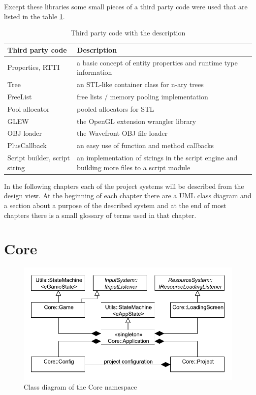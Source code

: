 \documentclass[a4paper, 12pt]{report}
\begin{document}
Except these libraries some small pieces of a third party code were used that are listed in the table \ref{tab:code-list}.

\begin{table}[htbp]
	\centering
		\begin{tabular}{|p{0.28\hsize}|p{0.65\hsize}|}
			\hline
			Third party code & Description\\
			\hline
			Properties, RTTI\cite{gpg5} & a basic concept of entity properties and runtime type information\\
			Tree\cite{tree} & an STL-like container class for n-ary trees\\
			FreeList\cite{gpg5} & free lists / memory pooling implementation\\
			Pool allocator\cite{allocator} & pooled allocators for STL\\
			GLEW\cite{glew} & the OpenGL extension wrangler library\\
			OBJ loader\cite{objloader} & the Wavefront OBJ file loader\\
			PlusCallback\cite{pluscallback} & an easy use of function and method callbacks\\
			Script builder, script string\cite{angelscript} & an implementation of strings in the script engine and building more files to a script module\\
			\hline
		\end{tabular}
	\caption[Third party code with the description]{Third party code with the description}
	\label{tab:code-list}
\end{table}

In the following chapters each of the project systems will be described from the design view. At the beginning of each chapter there are a UML class diagram
and a section about a purpose of the described system and at the end of most chapters there is a small glossary of terms used in that chapter.


\chapter{Core}

\begin{figure}[htbp]
	\centering
		\includegraphics[width=1\textwidth]{CoreClassDiagram.pdf}
	\caption{Class diagram of the Core namespace}
	\label{fig:core-diagram}
\end{figure}
\end{document}
